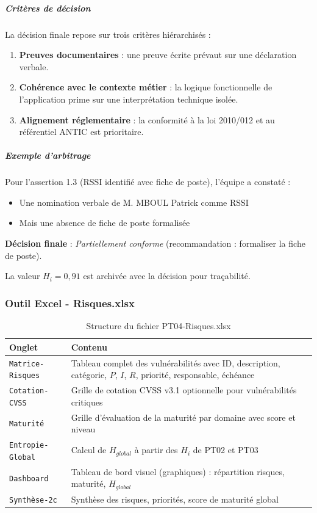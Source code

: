 \documentclass[12pt,a4paper,oneside]{report}
\begin{document}
\subparagraph{Critères de décision}

La décision finale repose sur trois critères hiérarchisés :
\begin{enumerate}[label={\color{gold}\theenumi.}, leftmargin=*]
	\item \textbf{Preuves documentaires} : une preuve écrite prévaut sur une déclaration verbale.
	\item \textbf{Cohérence avec le contexte métier} : la logique fonctionnelle de l'application prime sur une interprétation technique isolée.
	\item \textbf{Alignement réglementaire} : la conformité à la loi 2010/012 et au référentiel ANTIC est prioritaire.
\end{enumerate}

\subparagraph{Exemple d'arbitrage}

Pour l'assertion 1.3 (RSSI identifié avec fiche de poste), l'équipe a constaté :
\begin{itemize}[label={\color{gold}}, leftmargin=*]
	\item Une nomination verbale de M. MBOUL Patrick comme RSSI
	\item Mais une absence de fiche de poste formalisée
\end{itemize}

\textbf{Décision finale} : \textit{Partiellement conforme} (recommandation : formaliser la fiche de poste).

La valeur $H_i = 0,91$ est archivée avec la décision pour traçabilité.
\subsubsection{Outil Excel - Risques.xlsx}

\begin{table}[H]
	\centering\small
	\caption{Structure du fichier PT04-Risques.xlsx}
	\label{tab:pt04}
	\begin{tabularx}{\textwidth}{p{4cm}X}
		\toprule
		\rowcolor{theadcolor}
		\color{white}\textbf{Onglet} &
		\color{white}\textbf{Contenu} \\
		\midrule
		\texttt{Matrice-Risques} & Tableau complet des vulnérabilités avec ID, description, catégorie, $P$, $I$, $R$, priorité, responsable, échéance \\
		\texttt{Cotation-CVSS} & Grille de cotation CVSS v3.1 optionnelle pour vulnérabilités critiques \\
		\texttt{Maturité} & Grille d'évaluation de la maturité par domaine avec score et niveau \\
		\texttt{Entropie-Global} & Calcul de $H_{global}$ à partir des $H_i$ de PT02 et PT03 \\
		\texttt{Dashboard} & Tableau de bord visuel (graphiques) : répartition risques, maturité, $H_{global}$ \\
		\texttt{Synthèse-2c} & Synthèse des risques, priorités, score de maturité global \\
		\bottomrule
	\end{tabularx}
\end{table}
\end{document}
